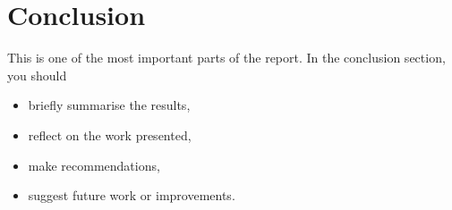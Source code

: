 \documentclass{UoNMCHA}
\numberwithin{equation}{section}
\begin{document}
\section{Conclusion}\label{sec:Conclusion}
This is one of the most important parts of the report. In the conclusion section, you  should 
\begin{itemize}
\item briefly summarise the results,
\item reflect on the work presented, 
\item make recommendations,
\item suggest future work or improvements.
\end{itemize}



\appendix
\newpage
\end{document}
